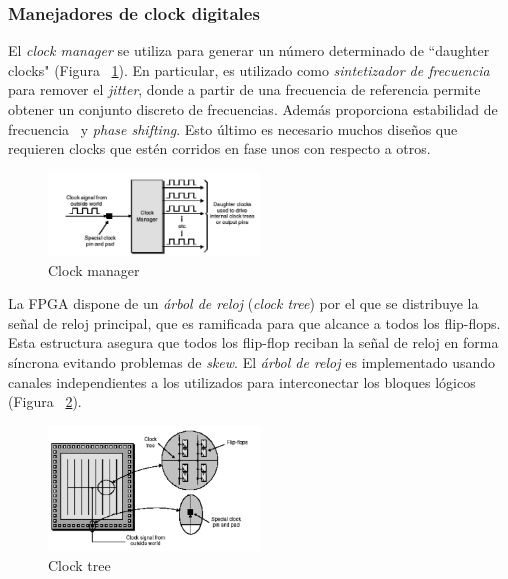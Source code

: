 \subsubsection{Manejadores de clock digitales}

El \textit{clock manager} se utiliza para generar un número
determinado de “daughter clocks" (Figura ~\ref{fig:dclocks}). En
particular, es utilizado como \textit{sintetizador de frecuencia} para
remover el \textit{jitter}, donde a partir de una frecuencia de
referencia permite obtener un conjunto discreto de frecuencias. Además
proporciona estabilidad de frecuencia~\cite{Etiqueta03} y
\textit{phase shifting}. Esto último es necesario muchos diseños que
requieren clocks que estén corridos en fase unos con respecto a otros.

\begin{figure}[h!]
\begin{center}
\includegraphics[width=0.5\textwidth,keepaspectratio=true]{./images/dougther}
\caption{Clock manager}
\label{fig:dclocks}
\end{center}
\end{figure}

La FPGA dispone de un \textit{árbol de reloj} (\textit{clock tree})
por el que se distribuye la señal de reloj principal, que es
ramificada para que alcance a todos los flip-flops. Esta estructura
asegura que todos los flip-flop reciban la señal de reloj en forma
síncrona evitando problemas de \textit{skew}. El \textit{árbol de
  reloj} es implementado usando canales independientes a los
utilizados para interconectar los bloques lógicos (Figura
~\ref{fig:ctree}).

\begin{figure}[h!]
\begin{center}
\includegraphics[width=0.5\textwidth,keepaspectratio=true]{./images/clocktree}
\caption{Clock tree}
\label{fig:ctree}
\end{center}
\end{figure}


